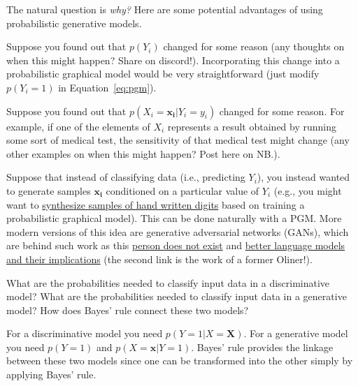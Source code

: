 \documentclass[assignment03_Solutions]{subfiles}
\begin{document}
The natural question is \emph{why?} Here are some potential advantages of using probabilistic generative models.
\bi
\item Suppose you found out that $p(Y_i)$ changed for some reason (any thoughts on when this might happen?  Share on discord!).  Incorporating this change into a probabilistic graphical model would be very straightforward (just modify $p(Y_i =1)$ in Equation~\ref{eq:pgm}).
\item Suppose you found out that $p(X_i  = \mathbf{x_i} | Y_i = y_i)$ changed for some reason.  For example, if one of the elements of $X_i$ represents a result obtained by running some sort of medical test, the sensitivity of that medical test might change (any other examples on when this might happen? Post here on NB.).
\item Suppose that instead of classifying data (i.e., predicting $Y_i$), you instead wanted to generate samples $\mathbf{x_i}$ conditioned on a particular value of $Y_i$ (e.g., you might want to \href{https://www.youtube.com/watch?v=LzE1fF0_3q0}{synthesize samples of hand written digits} based on training a probabilistic graphical model).  This can be done naturally with a PGM.  More modern versions of this idea are generative adversarial networks (GANs), which are behind such work as this \href{https://thispersondoesnotexist.com/}{person does not exist} and \href{https://openai.com/blog/better-language-models/}{better language models and their implications} (the second link is the work of a former Oliner!).
\ei

\begin{understandingcheck}
What are the probabilities needed to classify input data in a discriminative model?  What are the probabilities needed to classify input data in a generative model?  How does Bayes' rule connect these two models?

\begin{boxedsolution}
For a discriminative model you need $p(Y=1 | X = \mathbf{X})$.  For a generative model you need $p(Y=1)$ and $p(X = \mathbf{x} | Y=1)$.  Bayes' rule provides the linkage between these two models since one can be transformed into the other simply by applying Bayes' rule.
\end{boxedsolution}
\end{understandingcheck}
\end{document}
